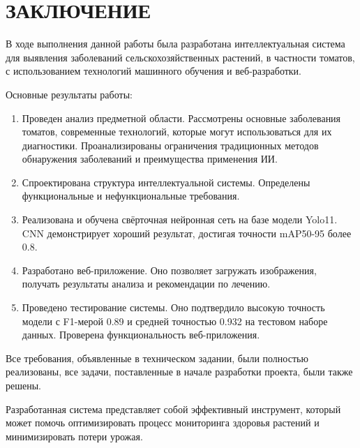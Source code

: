 \section*{ЗАКЛЮЧЕНИЕ}

В ходе выполнения данной работы была разработана интеллектуальная система для выявления заболеваний сельскохозяйственных растений, в частности томатов, с использованием технологий машинного обучения и веб-разработки. 

Основные результаты работы:

\begin{enumerate}
\item Проведен анализ предметной области. Рассмотрены основные заболевания томатов, современные технологий, которые могут использоваться для их диагностики. Проанализированы ограничения традиционных методов обнаружения заболеваний и преимущества применения ИИ.
\item Спроектирована структура интеллектуальной системы. Определены функциональные и нефункциональные требования.
\item Реализована и обучена свёрточная нейронная сеть на базе модели Yolo11. CNN демонстрирует хороший результат, достигая точности mAP50-95 более 0.8.
\item Разработано веб-приложение. Оно позволяет загружать изображения, получать результаты анализа и рекомендации по лечению.
\item Проведено тестирование системы. Оно подтвердило высокую точность модели с F1-мерой 0.89 и средней точностью 0.932 на тестовом наборе данных. Проверена функциональность веб-приложения.
\end{enumerate}

Все требования, объявленные в техническом задании, были полностью реализованы, все задачи, поставленные в начале разработки проекта, были также решены.

Разработанная система представляет собой эффективный инструмент, который может помочь оптимизировать процесс мониторинга здоровья растений и минимизировать потери урожая.
